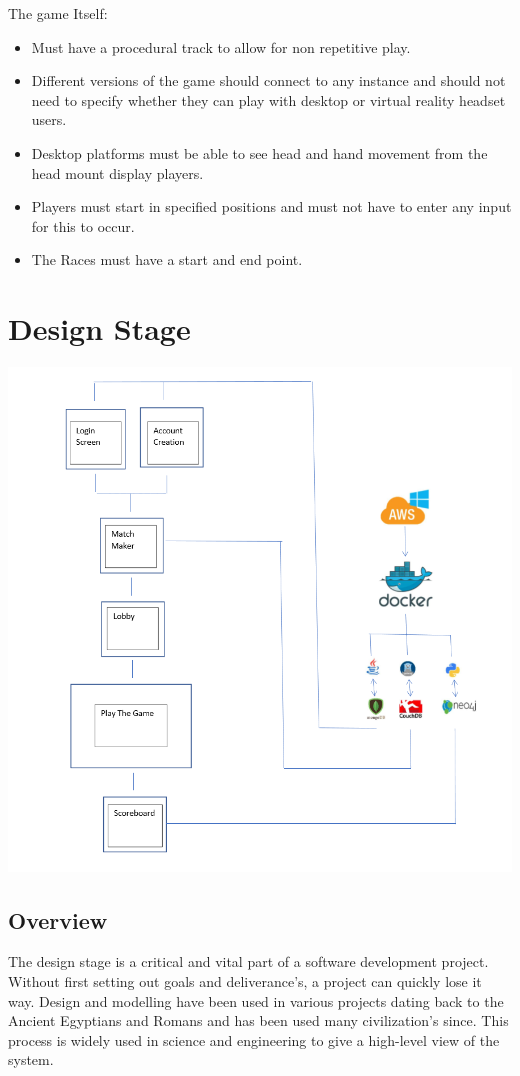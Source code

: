 The game Itself:
\begin{itemize}
\item Must have a procedural track to allow for non repetitive play.
\item Different versions of the game should connect to any instance and should not need to specify whether they can play with desktop or virtual reality headset users.
\item Desktop platforms must be able to see head and hand movement from the head mount display players.
\item Players must start in specified positions and must not have to enter any input for this to occur.
\item The Races must have a start and end point.
\end{itemize}

\newpage
\section{Design Stage}

\includegraphics[width=1\columnwidth]{img/Overview.PNG}
\subsection {Overview}
The design stage is a critical and vital part of a software development project. Without first setting out goals and deliverance's, a project can quickly lose it way. Design and modelling have been used in various projects dating back to the Ancient Egyptians and Romans and has been used many civilization's since. This process is widely used in science and engineering to give a high-level view of the system.
\newline

